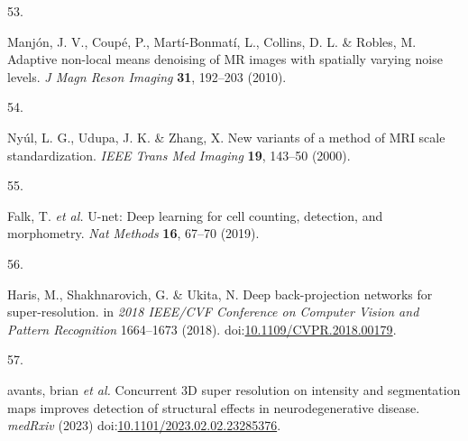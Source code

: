 \documentclass[
  12pt,
]{article}
\newlength{\cslhangindent}
\newlength{\csllabelwidth}
\newenvironment{CSLReferences}[2] %
 {%
  \setlength{\parindent}{0pt}
  \ifodd #1 \everypar{\setlength{\hangindent}{\cslhangindent}}\ignorespaces\fi
  \ifnum #2 > 0
  \setlength{\parskip}{#2\baselineskip}
  \fi
 }%
 {}
\newcommand{\CSLLeftMargin}[1]{\parbox[t]{\csllabelwidth}{#1}}
\newcommand{\CSLRightInline}[1]{\parbox[t]{\linewidth - \csllabelwidth}{#1}\break}
\begin{document}
\begin{CSLReferences}{0}{0}
\leavevmode{}%
\CSLLeftMargin{53. }
\CSLRightInline{Manjón, J. V., Coupé, P., Martí-Bonmatí, L., Collins, D.
L. \& Robles, M. Adaptive non-local means denoising of {MR} images with
spatially varying noise levels. \emph{J Magn Reson Imaging} \textbf{31},
192--203 (2010).}

\leavevmode{}%
\CSLLeftMargin{54. }
\CSLRightInline{Nyúl, L. G., Udupa, J. K. \& Zhang, X. New variants of a
method of MRI scale standardization. \emph{IEEE Trans Med Imaging}
\textbf{19}, 143--50 (2000).}

\leavevmode{}%
\CSLLeftMargin{55. }
\CSLRightInline{Falk, T. \emph{et al.} U-net: Deep learning for cell
counting, detection, and morphometry. \emph{Nat Methods} \textbf{16},
67--70 (2019).}

\leavevmode{}%
\CSLLeftMargin{56. }
\CSLRightInline{Haris, M., Shakhnarovich, G. \& Ukita, N. Deep
back-projection networks for super-resolution. in \emph{2018 {IEEE/CVF}
{C}onference on {C}omputer {V}ision and {P}attern {R}ecognition}
1664--1673 (2018).
doi:\href{https://doi.org/10.1109/CVPR.2018.00179}{10.1109/CVPR.2018.00179}.}

\leavevmode{}%
\CSLLeftMargin{57. }
\CSLRightInline{avants, brian \emph{et al.} Concurrent 3D super
resolution on intensity and segmentation maps improves detection of
structural effects in neurodegenerative disease. \emph{medRxiv} (2023)
doi:\href{https://doi.org/10.1101/2023.02.02.23285376}{10.1101/2023.02.02.23285376}.}

\end{CSLReferences}
\end{document}

